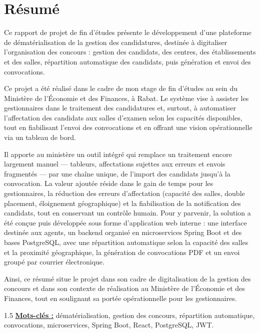 \chapter*{Résumé}
\adjustmtc
\thispagestyle{MyStyle}

Ce rapport de projet de fin d'études présente le développement d'une plateforme de dématérialisation de la gestion des candidatures, destinée à digitaliser l'organisation des concours : gestion des candidats, des centres, des établissements et des salles, répartition automatique des candidats, puis génération et envoi des convocations.

Ce projet a été réalisé dans le cadre de mon stage de fin d'études au sein du Ministère de l'Économie et des Finances, à Rabat. Le système vise à assister les gestionnaires dans le traitement des candidatures et, surtout, à automatiser l'affectation des candidats aux salles d'examen selon les capacités disponibles, tout en fiabilisant l'envoi des convocations et en offrant une vision opérationnelle via un tableau de bord.

Il apporte au ministère un outil intégré qui remplace un traitement encore largement manuel --- tableurs, affectations sujettes aux erreurs et envois fragmentés --- par une chaîne unique, de l'import des candidats jusqu'à la convocation. La valeur ajoutée réside dans le gain de temps pour les gestionnaires, la réduction des erreurs d'affectation (capacité des salles, double placement, éloignement géographique) et la fiabilisation de la notification des candidats, tout en conservant un contrôle humain. Pour y parvenir, la solution a été conçue puis développée sous forme d'application web interne : une interface destinée aux agents, un backend organisé en microservices Spring Boot et des bases PostgreSQL, avec une répartition automatique selon la capacité des salles et la proximité géographique, la génération de convocations PDF et un envoi groupé par courrier électronique.

Ainsi, ce résumé situe le projet dans son cadre de digitalisation de la gestion des concours et dans son contexte de réalisation au Ministère de l'Économie et des Finances, tout en soulignant sa portée opérationnelle pour les gestionnaires.

\begin{spacing}{1.5}
\underline{\textbf{Mots-clés :}} dématérialisation, gestion des concours, répartition automatique, convocations, microservices, Spring Boot, React, PostgreSQL, JWT.
\end{spacing}

